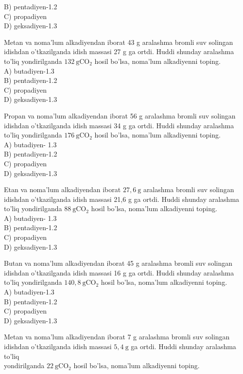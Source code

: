 B) pentadiyen-1.2\\
C) propadiyen\\
D) geksadiyen-1.3
  \item Metan va noma'lum alkadiyendan iborat 43 g aralashma bromli suv solingan idishdan o'tkazilganda idish massasi 27 g ga ortdi. Huddi shunday aralashma to'liq yondirilganda $132 \mathrm{~g} \mathrm{CO}_{2}$ hosil bo'lsa, noma'lum alkadiyenni toping.\\
A) butadiyen-1.3\\
B) pentadiyen-1.2\\
C) propadiyen\\
D) geksadiyen-1.3
  \item Propan va noma'lum alkadiyendan iborat 56 g aralashma bromli suv solingan idishdan o'tkazilganda idish massasi 34 g ga ortdi. Huddi shunday aralashma to'liq yondirilganda $176 \mathrm{~g} \mathrm{CO}_{2}$ hosil bo'lsa, noma'lum alkadiyenni toping.\\
A) butadiyen- 1.3\\
B) pentadiyen-1.2\\
C) propadiyen\\
D) geksadiyen-1.3
  \item Etan va noma'lum alkadiyendan iborat $27,6 \mathrm{~g}$ aralashma bromli suv solingan idishdan o'tkazilganda idish massasi 21,6 g ga ortdi. Huddi shunday aralashma to'liq yondirilganda $88 \mathrm{~g} \mathrm{CO}_{2}$ hosil bo'lsa, noma'lum alkadiyenni toping.\\
A) butadiyen- 1.3\\
B) pentadiyen-1.2\\
C) propadiyen\\
D) geksadiyen-1.3
  \item Butan va noma'lum alkadiyendan iborat 45 g aralashma bromli suv solingan idishdan o'tkazilganda idish massasi 16 g ga ortdi. Huddi shunday aralashma to'liq yondirilganda $140,8 \mathrm{~g} \mathrm{CO}_{2}$ hosil bo'lsa, noma'lum alkadiyenni toping.\\
A) butadiyen-1.3\\
B) pentadiyen-1.2\\
C) propadiyen\\
D) geksadiyen-1.3
  \item Metan va noma'lum alkadiyendan iborat 7 g aralashma bromli suv solingan idishdan o'tkazilganda idish massasi $5,4 \mathrm{~g}$ ga ortdi. Huddi shunday aralashma to'liq\\
yondirilganda $22 \mathrm{~g} \mathrm{CO}_{2}$ hosil bo'lsa, noma'lum alkadiyenni toping.\\
